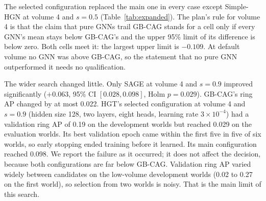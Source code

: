 \documentclass[pdflatex,sn-vancouver-num]{sn-jnl}
\begin{document}
The selected configuration replaced the main one in every case except Simple-HGN at volume 4 and $s=0.5$
(Table~\ref{tab:expanded}). The plan's rule for volume 4 is that the claim that pure GNNs trail GB-CAG stands for a
cell only if every GNN's mean stays below GB-CAG's and the upper 95\% limit of its difference is below zero. Both cells
meet it: the largest upper limit is $-0.109$. At default volume no GNN was above GB-CAG, so the statement that no
pure GNN outperformed it needs no qualification.

The wider search changed little. Only SAGE at volume 4 and $s=0.9$ improved significantly ($+0.063$, 95\% CI
$[0.028, 0.098]$, Holm $p=0.029$). GB-CAG's ring AP changed by at most 0.022. HGT's selected configuration at volume 4
and $s=0.9$ (hidden size 128, two layers, eight heads, learning rate $3\times10^{-4}$) had a validation ring AP of
0.19 on the development worlds but reached 0.029 on the evaluation worlds. Its best validation epoch came within the
first five in five of six worlds, so early stopping ended training before it learned. Its main configuration reached
0.098. We report the failure as it occurred; it does not affect the decision, because both configurations are far
below GB-CAG. Validation ring AP varied widely between candidates on the low-volume development worlds (0.02 to 0.27
on the first world), so selection from two worlds is noisy. That is the main limit of this search.
\end{document}
